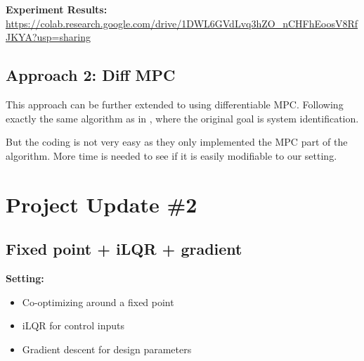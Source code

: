 \documentclass{article}
\begin{document}
\textbf{Experiment Results:} \url{https://colab.research.google.com/drive/1DWL6GVdLvq3hZO_nCHFhEoosV8RfJKYA?usp=sharing}





\subsection{Approach 2: Diff MPC\cite{amos2018differentiable}}

This approach can be further extended to using differentiable MPC. Following exactly the same algorithm as in \cite{amos2018differentiable}, where the original goal is system identification.


But the coding is not very easy as they only implemented the MPC part of the algorithm. More time is needed to see if it is easily modifiable to our setting.


\section{Project Update \#2}


\subsection{Fixed point + iLQR + gradient}


\textbf{Setting:}
\vspace{-5pt}
\begin{itemize}
    \setlength{\itemsep}{0pt}
    \setlength{\parsep}{0pt}
    \setlength{\parskip}{0pt}
    \item Co-optimizing around a fixed point
    \item iLQR for control inputs
    \item Gradient descent for design parameters
\end{itemize}
\end{document}
